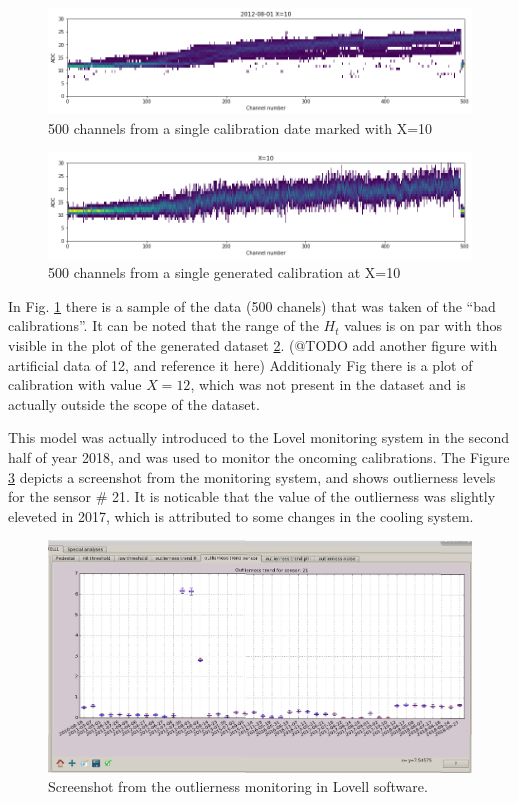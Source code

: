\begin{figure}
    \centering
    \includegraphics[width=0.7\linewidth]{figures/chapter4/outlierness/real_data.png}
    \caption{500 channels from a single calibration date marked with X=10}
    \label{plot:real-data}
  \end{figure}

\begin{figure}
    \centering
    \includegraphics[width=0.7\linewidth]{figures/chapter4/outlierness/generated_data.png}
    \caption{500 channels from a single generated calibration at X=10}
    \label{plot:generated-data}
  \end{figure}

In Fig. \ref{plot:real-data} there is a sample of the data (500 chanels) that was taken of the ``bad calibrations''. It can be noted that the range of the $H_{t}$ values is on par with thos visible in the plot of the generated dataset \ref{plot:generated-data}.
(@TODO add another figure with artificial data of 12, and reference it here) Additionaly Fig there is a plot of calibration with value $X=12$, which was not present in the dataset and is actually outside the scope of the dataset.

This model was actually introduced to the Lovel monitoring system in the second half of year 2018, and was used to monitor the oncoming calibrations. The Figure \ref{plot:gui} depicts a screenshot from the monitoring system, and shows outlierness levels for the sensor \# 21. It is noticable that the value of the outlierness was slightly eleveted in 2017, which is attributed to some changes in the cooling system.


\begin{figure}
    \centering
    \includegraphics[width=0.7\linewidth]{figures/chapter4/outlierness/calina_lovell_screenshot.png}
    \caption{Screenshot from the outlierness monitoring in Lovell software.}
    \label{plot:gui}
  \end{figure}



